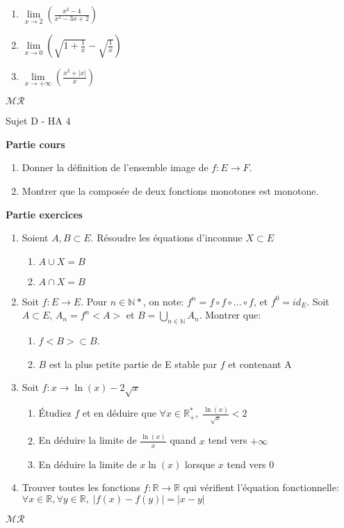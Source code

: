 \documentclass[a4paper,11pt, landscape]{article}
\begin{document}
\begin{multicols*}{4}
\begin{enumerate}[leftmargin=*]
\begin{enumerate}
    \item $\lim\limits_{x \rightarrow 2}\left(\frac{x^2 - 4}{x^2 - 3x+2}\right)$
    \item $\lim\limits_{x \rightarrow 0 }\left(\sqrt{1+\frac{1}{x}} - \sqrt{\frac{1}{x}}\right)$
    \item $\lim\limits_{x \rightarrow +\infty }\left(\frac{x^2 + |x|}{x}\right)$
  \end{enumerate}
\end{enumerate}
\centerline{$\mathcal{MR}$}
\vfill\null
\columnbreak
\centerline{Sujet D - HA 4}
\begin{flushleft}
  \textbf{Partie cours} 
\end{flushleft} 
\begin{enumerate}[leftmargin=*]
  \item Donner la définition de l'ensemble image de $f : E \rightarrow F$.
  \item Montrer que la composée de deux fonctions monotones est monotone.
\end{enumerate}
\textbf{Partie exercices}
\begin{enumerate}[leftmargin=*]
 \item Soient $A, B \subset E$. Résoudre les équations d'inconnue $X \subset E$
 \begin{enumerate}
   \item $A \cup X = B$
   \item $A \cap X = B$
 \end{enumerate}
 \item Soit $f: E \rightarrow E$. Pour $n \in \mathbb{N}*$, on note: $f^n = f \circ f \circ ... \circ f$, et $f^0 = id_E$. Soit $A \subset E$, $A_n = f^n<A>$ et $B = \bigcup_{n \in \mathbb{N}}A_n$.
 Montrer que: 
 \begin{enumerate}
   \item $f<B> \subset B$.
   \item $B$ est la plus petite partie de E stable par $f$ et contenant A
 \end{enumerate}
 \item Soit $f : x \rightarrow \ln \left(x\right) - 2\sqrt{x}$
 \begin{enumerate}
   \item Étudiez $f$ et en déduire que $\forall x \in \mathbb{R}_+^*, \; \frac{\ln (x)}{\sqrt{x}} < 2$
   \item En déduire la limite de $\frac{\ln(x)}{x}$ quand $x$ tend vers $+\infty$
   \item En déduire la limite de $x\ln(x)$ lorsque $x$ tend vers 0
 \end{enumerate}
 \item Trouver toutes les fonctions $f : \mathbb{R} \rightarrow \mathbb{R}$ qui vérifient l'équation fonctionnelle: $\forall x \in \mathbb{R}, \forall y \in \mathbb{R}, \; |f(x) - f(y)| = |x - y|$
\end{enumerate}
\centerline{$\mathcal{MR}$}

\end{multicols*}
\end{document}
